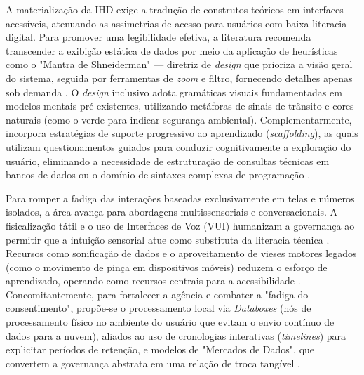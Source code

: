 \documentclass[12pt]{article}
\begin{document}
    A materialização da IHD exige a tradução de construtos teóricos em interfaces acessíveis, atenuando as assimetrias de acesso para usuários com baixa literacia digital. Para promover uma legibilidade efetiva, a literatura recomenda transcender a exibição estática de dados por meio da aplicação de heurísticas como o "Mantra de Shneiderman" — diretriz de \textit{design} que prioriza a visão geral do sistema, seguida por ferramentas de \textit{zoom} e filtro, fornecendo detalhes apenas sob demanda \cite{Paredes2022317, Bartram2022, Victorelli2020Human}. O \textit{design} inclusivo adota gramáticas visuais fundamentadas em modelos mentais pré-existentes, utilizando metáforas de sinais de trânsito e cores naturais (como o verde para indicar segurança ambiental). Complementarmente, incorpora estratégias de suporte progressivo ao aprendizado (\textit{scaffolding}), as quais utilizam questionamentos guiados para conduzir cognitivamente a exploração do usuário, eliminando a necessidade de estruturação de consultas técnicas em bancos de dados ou o domínio de sintaxes complexas de programação \cite{Yuan20243615, Chatzimichali2021160, Lindley2020, Coleti2020TR, Capeleti2024Human, Belizario2023Interacao, Friedman2024, Alhakamy2020246, Trajkova2020}.

    Para romper a fadiga das interações baseadas exclusivamente em telas e números isolados, a área avança para abordagens multissensoriais e conversacionais. A fisicalização tátil e o uso de Interfaces de Voz (VUI) humanizam a governança ao permitir que a intuição sensorial atue como substituta da literacia técnica \cite{DeKreij2024, Burzio2024, Kreij, Ranasinghe2023, Lee-Smith2023, Xia2021, Seidelin2018, Parviainen2016, Sailaja2024334, Jordan2023, Sailaja2021, Jones2017}. Recursos como sonificação de dados e o aproveitamento de vieses motores legados (como o movimento de pinça em dispositivos móveis) reduzem o esforço de aprendizado, operando como recursos centrais para a acessibilidade \cite{Kurze2023, Xie2021365, Roberts2017343, Lenzi2024, Lenzi, Roberts2023}. Concomitantemente, para fortalecer a agência e combater a "fadiga do consentimento", propõe-se o processamento local via \textit{Databoxes} (nós de processamento físico no ambiente do usuário que evitam o envio contínuo de dados para a nuvem), aliados ao uso de cronologias interativas (\textit{timelines}) para explicitar períodos de retenção, e modelos de "Mercados de Dados", que convertem a governança abstrata em uma relação de troca tangível \cite{coleti2024humanSillabus, Bowyer2022, Elhamdadi2022, Turkay2021, Crabtree2016, DOWTHWAITE2024, DeAlmeida2019, Coleti2019DesigPatterns, Lockwood2020AnAccessible, Hutton2017, Briggs2021, Chowdhury2016, Mashhadi2014, Barreto2018}.
\end{document}
